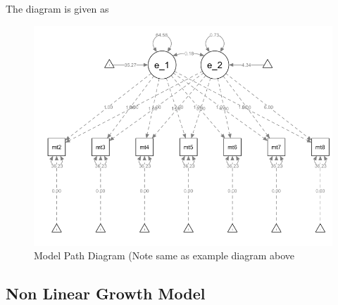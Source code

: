 The diagram is given as 
\begin{figure}[ht]
    \centering
    \includegraphics{images/006_linear_growth_model_path.png}
    \caption{Model Path Diagram (Note same as example diagram above}
    \label{fig:linear_growth_mod_path}
\end{figure}



\subsection{Non Linear Growth Model} 

